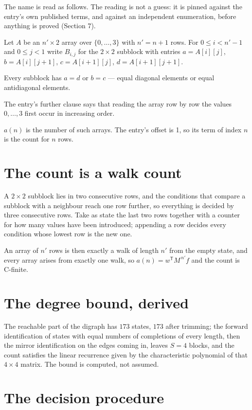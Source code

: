 \documentclass[11pt]{article}
\theoremstyle{definition}
\begin{document}
The name is read as follows. The reading is not a guess: it is pinned against the entry's own published terms, and against an independent enumeration, before anything is proved (Section 7).

Let $A$ be an $n' \times 2$ array over $\{0,\dots,3\}$ with $n' = n + 1$ rows. For $0 \le i < n'-1$ and $0 \le j < 1$ write $B_{i,j}$ for the $2\times2$ subblock with entries $a = A[i][j]$, $b = A[i][j{+}1]$, $c = A[i{+}1][j]$, $d = A[i{+}1][j{+}1]$.

Every subblock has $a = d$ or $b = c$ --- equal diagonal elements or equal antidiagonal elements.

The entry's further clause says that reading the array row by row the values $0,\dots,3$ first occur in increasing order.

$a(n)$ is the number of such arrays. The entry's offset is 1, so its term of index $n$ is the count for $n$ rows.

\section{The count is a walk count}

A $2\times2$ subblock lies in two consecutive rows, and the conditions that compare a subblock with a neighbour reach one row further, so everything is decided by three consecutive rows. Take as state the last two rows together with a counter for how many values have been introduced; appending a row decides every condition whose lowest row is the new one.

An array of $n'$ rows is then exactly a walk of length $n'$ from the empty state, and every array arises from exactly one walk, so $a(n) = w^{\mathsf T}M^{\,n'}f$ and the count is C-finite.

\section{The degree bound, derived}

The reachable part of the digraph has $173$ states, $173$ after trimming; the forward identification of states with equal numbers of completions of every length, then the mirror identification on the edges coming in, leaves $S = 4$ blocks, and the count satisfies the linear recurrence given by the characteristic polynomial of that $4\times4$ matrix. The bound is computed, not assumed.

\section{The decision procedure}
\end{document}

